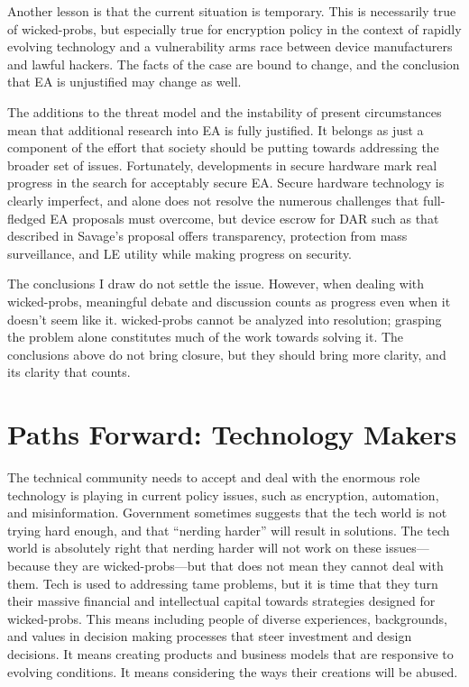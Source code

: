 Another lesson is that the current situation is temporary. This is necessarily true of \acp{wicked-prob}, but especially
true for encryption policy in the context of rapidly evolving technology and a vulnerability arms race between device
manufacturers and lawful hackers. The facts of the case are bound to change, and the conclusion that \ac{EA} is
unjustified may change as well.


The additions to the threat model and the instability of present circumstances mean that additional research into
\ac{EA} is fully justified. It belongs as just a component of the effort that society should be putting towards
addressing the broader set of issues. Fortunately, developments in secure hardware mark real progress in the search for
acceptably secure \ac{EA}. Secure hardware technology is clearly imperfect, and alone does not resolve the numerous
challenges that full-fledged \ac{EA} proposals must overcome, but device escrow for \acl{DAR} such as that described in
Savage's proposal offers transparency, protection from mass surveillance, and \acl{LE} utility while making progress on
security.


The conclusions I draw do not settle the issue. However, when dealing with \acp{wicked-prob}, meaningful debate and
discussion counts as progress even when it doesn't seem like it. \Acp{wicked-prob} cannot be analyzed into resolution;
grasping the problem alone constitutes much of the work towards solving it. The conclusions above do not bring closure,
but they should bring more clarity, and its clarity that counts.


\section{Paths Forward: Technology Makers}

The technical community needs to accept and deal with the enormous role technology is playing in current policy issues,
such as encryption, automation, and misinformation. Government sometimes suggests that the tech world is not trying hard
enough, and that ``nerding harder'' will result in solutions. The tech world is absolutely right that nerding harder
will not work on these issues---because they are \acp{wicked-prob}---but that does not mean they cannot deal with them.
Tech is used to addressing tame problems, but it is time that they turn their massive financial and intellectual capital
towards strategies designed for \acp{wicked-prob}. This means including people of diverse experiences, backgrounds, and
values in decision making processes that steer investment and design decisions. It means creating products and business
models that are responsive to evolving conditions. It means considering the ways their creations will be abused.

